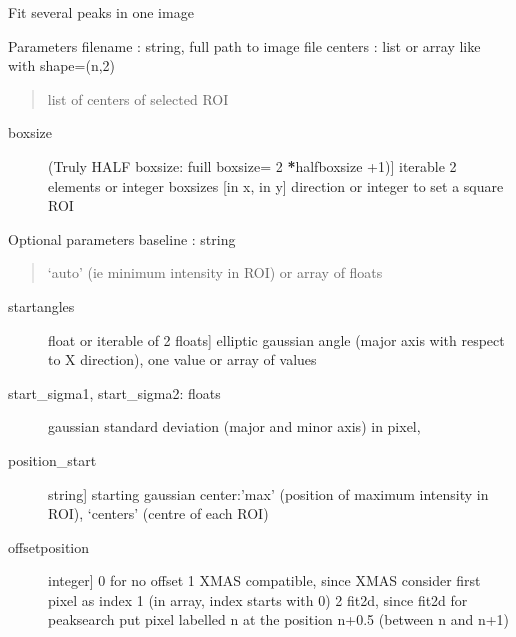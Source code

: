 \documentclass[letterpaper,10pt,english]{sphinxmanual}
\begin{document}
\begin{fulllineitems}
\label{\detokenize{PeakSearch:LaueTools.readmccd.readoneimage_multiROIfit}}
Fit several peaks in one image

Parameters
filename : string, full path to image file
centers : list or array like with shape=(n,2)
\begin{quote}

list of centers of selected ROI
\end{quote}
\begin{description}
\item[{boxsize}] \leavevmode{[}(Truly HALF boxsize: fuill boxsize= 2 {\color{red}\bfseries{}*}halfboxsize +1){]}
iterable 2 elements or integer
boxsizes {[}in x, in y{]} direction or integer to set a square ROI

\end{description}

Optional parameters
baseline : string
\begin{quote}

‘auto’ (ie minimum intensity in ROI) or array of floats
\end{quote}
\begin{description}
\item[{startangles}] \leavevmode{[}float or iterable of 2 floats{]}
elliptic gaussian angle (major axis with respect to X direction),
one value or array of values

\item[{start\_sigma1, start\_sigma2: floats}] \leavevmode
gaussian standard deviation (major and minor axis) in pixel,

\item[{position\_start}] \leavevmode{[}string{]}
starting gaussian center:’max’ (position of maximum intensity in ROI),
‘centers’ (centre of each ROI)

\item[{offsetposition}] \leavevmode{[}integer{]}
0 for no offset
1  XMAS compatible, since XMAS consider first pixel as index 1 (in array, index starts with 0)
2  fit2d, since fit2d for peaksearch put pixel labelled n at the position n+0.5 (between n and n+1)


\end{description}
\end{fulllineitems}
\end{document}
